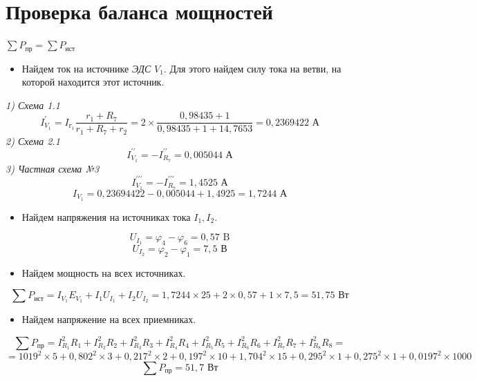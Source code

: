 \documentclass[12pt, a4paper]{report}
\begin{document}
    \newpage

    \section{\textbf{Проверка баланса мощностей}}
    \begin{center}
        $\sum P_{\text{пр}} = \sum P_{\text{ист}}$
    \end{center}
    \begin{itemize}
        \item Найдем ток на источнике \textit{ЭДС} $V_1$. Для этого найдем силу тока на ветви, на которой находится этот источник.
    \end{itemize}
    \textit{1) Схема 1.1}
    \[ I_{V_1}^{\prime} = I_{г_1}\frac{r_1 + R_7}{r_1 + R_7 + r_2} = 2 \times \frac{0,98435 + 1}{0,98435 + 1 + 14,7653} = 0,2369422 \text{ А} \]
    \textit{2) Схема 2.1}
    \[ I_{V_1}^{\prime\prime} = - I_{R_7}^{\prime\prime} = 0,005044 \text{ А} \]
    \textit{3) Частная схема №3}
    \[ I_{V_1}^{\prime\prime\prime} = - I_{R_7}^{\prime\prime\prime} = 1,4525 \text{ А} \]\smallskip
    \[ I_{V_1} = 0,23694422 - 0,005044 + 1,4925 = 1,7244 \text{ А} \]
    \begin{itemize}
        \item Найдем напряжения на источниках тока $I_1, I_2$.
    \end{itemize}
    \[ U_{I_1} = \varphi_4 - \varphi_6 = 0,57 \text{ B} \]
    \[ U_{I_2} = \varphi_2 - \varphi_1 = 7,5 \text{ В} \]
    \begin{itemize}
        \item Найдем мощность на всех источниках.
    \end{itemize}
    \[ \sum P_{\text{ист}} = I_{V_1}E_{V_1} + I_{1}U_{I_1} + I_{2}U_{I_2} = 1,7244 \times 25 + 2 \times 0,57 + 1 \times 7,5 = 51,75 \text{ Вт} \]
    \begin{itemize}
        \item Найдем напряжение на всех приемниках.
    \end{itemize}
    \[ \sum P_{\text{пр}} = I_{R_1}^{2}R_1 + I_{R_2}^{2}R_2 + I_{R_3}^{2}R_3 + I_{R_4}^{2}R_4 + I_{R_5}^{2}R_5 + I_{R_6}^{2}R_6 + I_{R_7}^{2}R_7 + I_{R_8}^{2}R_8 = \]
    \[= 1019^{2} \times 5 + 0,802^{2} \times 3 + 0,217^{2} \times 2 + 0,197^{2} \times 10 + 1,704^{2} \times 15 + 0,295^{2} \times 1 + 0,275^{2} \times 1 + 0,0197^{2} \times 1000 \]
    \[\sum P_{\text{пр}} = 51,7 \text{ Вт}\]\smallskip
\end{document}
